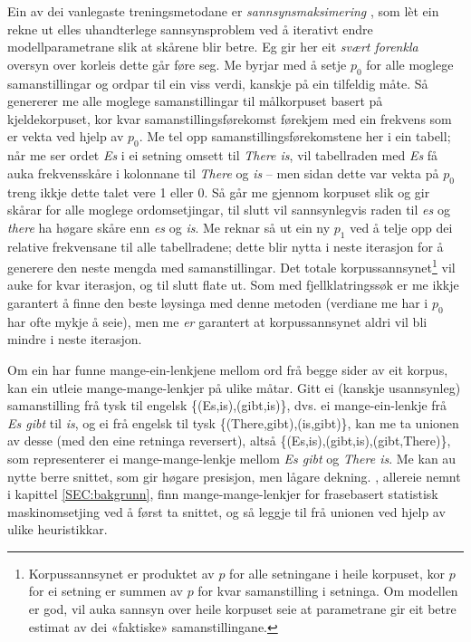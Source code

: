 \documentclass[12pt,a4paper,oneside,draft]{report}
\begin{document}
 Ein av dei vanlegaste treningsmetodane er \emph{sannsynsmaksimering}
 \citep[utførleg forklart i][]{prescher-em}, som lèt ein rekne ut
 elles uhandterlege sannsynsproblem ved å iterativt endre
 modellparametrane slik at skårene blir betre. Eg gir her eit \emph{svært  forenkla} oversyn over korleis dette går føre seg. Me byrjar med å
 setje $p_0$ for alle moglege samanstillingar og ordpar til ein viss
 verdi, kanskje på ein tilfeldig måte. Så genererer me alle moglege
 samanstillingar til målkorpuset basert på kjeldekorpuset, kor kvar
 samanstillingsførekomst førekjem med ein frekvens som er vekta ved
 hjelp av $p_0$. Me tel opp samanstillingsførekomstene her i ein
 tabell; når me ser ordet \emph{Es} i ei setning omsett til \emph{There is}, vil
 tabellraden med \emph{Es} få auka frekvensskåre i kolonnane til \emph{There} og
 \emph{is} -- men sidan dette var vekta på $p_0$ treng ikkje dette talet
 vere 1 eller 0. Så går me gjennom korpuset slik og gir skårar for
 alle moglege ordomsetjingar, til slutt vil sannsynlegvis raden til
 \emph{es} og \emph{there} ha høgare skåre enn \emph{es} og \emph{is}. Me reknar så ut ein
 ny $p_1$ ved å telje opp dei relative frekvensane til alle
 tabellradene; dette blir nytta i neste iterasjon for å generere den
 neste mengda med samanstillingar. Det totale korpussannsynet\footnote{Korpussannsynet er produktet av $p$ for alle setningane i
        heile korpuset, kor $p$ for ei setning er summen av $p$ for
        kvar samanstilling i setninga. Om modellen er god, vil auka
        sannsyn over heile korpuset seie at parametrane gir eit betre
        estimat av dei «faktiske» samanstillingane. }
 vil auke for kvar iterasjon, og til slutt flate ut. Som med
 fjellklatringssøk er me ikkje garantert å finne den beste løysinga
 med denne metoden (verdiane me har i $p_0$ har ofte mykje å seie),
 men me \emph{er} garantert at korpussannsynet aldri vil bli mindre i neste
 iterasjon.

 Om ein har funne mange-ein-lenkjene mellom ord frå begge sider av eit
 korpus, kan ein utleie mange-mange-lenkjer på ulike måtar. Gitt ei
 (kanskje usannsynleg) samanstilling frå tysk til engelsk
 \{(Es,is),(gibt,is)\}, dvs. ei mange-ein-lenkje frå \emph{Es gibt} til
 \emph{is}, og ei frå engelsk til tysk \{(There,gibt),(is,gibt)\}, kan me
 ta unionen av desse (med den eine retninga reversert), altså
 \{(Es,is),(gibt,is),(gibt,There)\}, som representerer ei
 mange-mange-lenkje mellom \emph{Es gibt} og \emph{There is}. Me kan au nytte
 berre snittet, som gir høgare presisjon, men lågare dekning.
 \citet{koehn2003spb}, allereie nemnt i kapittel \ref{SEC:bakgrunn},
 finn mange-mange-lenkjer for frasebasert statistisk maskinomsetjing
 ved å først ta snittet, og så leggje til frå unionen ved hjelp av
 ulike heuristikkar.
\end{document}
